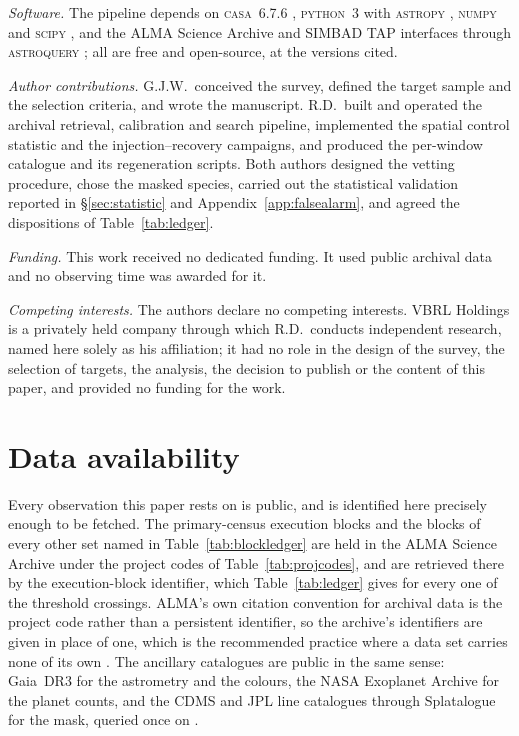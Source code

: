 \emph{Software.} The pipeline depends on \textsc{casa}~6.7.6
\citep{CASA2022}, \textsc{python}~3 with \textsc{astropy} \citep{Astropy2022}, \textsc{numpy}
\citep{Harris2020} and \textsc{scipy} \citep{Virtanen2020}, and the ALMA Science
Archive and SIMBAD TAP interfaces through \textsc{astroquery} \citep{Ginsburg2019};
all are free and open-source, at the versions cited.

\emph{Author contributions.} G.J.W.\ conceived the survey, defined the target sample and the selection
criteria, and wrote the manuscript. R.D.\ built and operated the archival
retrieval, calibration and search pipeline, implemented the spatial control
statistic and the injection--recovery campaigns, and produced the per-window
catalogue and its regeneration scripts. Both authors designed the vetting
procedure, chose the masked species, carried out the statistical
validation reported in \S\ref{sec:statistic} and
Appendix~\ref{app:falsealarm}, and agreed the dispositions of
Table~\ref{tab:ledger}.

\emph{Funding.} This work received no dedicated funding. It used public archival data and
no observing time was awarded for it.

\emph{Competing interests.} The authors declare no competing interests. VBRL Holdings is a privately
held company through which R.D.\ conducts independent research, named
here solely as his affiliation; it had no role in the design of the
survey, the selection of targets, the analysis, the decision to publish
or the content of this paper, and provided no funding for the work.

\section*{Data availability}
\label{sec:data}
Every observation this paper rests on is public, and is identified here
precisely enough to be fetched. The \NEB{} primary-census execution blocks and
the blocks of every other set named in Table~\ref{tab:blockledger} are held in
the ALMA Science Archive under the \NProjCodes{} project codes of
Table~\ref{tab:projcodes}, and are retrieved there by the execution-block
identifier, which Table~\ref{tab:ledger} gives for every one of the
\EvNCrossRaw{} threshold crossings. ALMA's own citation
convention for archival data is the project code rather than a persistent
identifier, so the archive's identifiers are given in place of one, which is
the recommended practice where a data set carries none of its own
\citep{Chen2022}. The
ancillary catalogues are public in the same sense: Gaia~DR3 for the astrometry
and the colours, the NASA Exoplanet Archive for the planet counts, and the
CDMS and JPL line catalogues through Splatalogue for the mask, queried once on
\McQueryDate.

